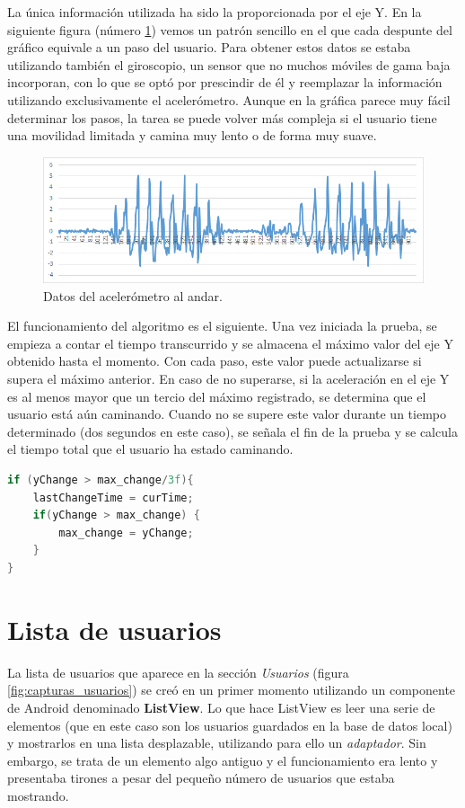 La única información utilizada ha sido la proporcionada por el eje Y. En la siguiente figura (número \ref{fig:acc_8}) vemos un patrón sencillo en el que cada despunte del gráfico equivale a un paso del usuario. Para obtener estos datos se estaba utilizando también el giroscopio, un sensor que no muchos móviles de gama baja incorporan, con lo que se optó por prescindir de él y reemplazar la información utilizando exclusivamente el acelerómetro. Aunque en la gráfica parece muy fácil determinar los pasos, la tarea se puede volver más compleja si el usuario tiene una movilidad limitada y camina muy lento o de forma muy suave.

\begin{figure}[H]
	\centering
	\includegraphics[scale=0.65]{imagenes/grafico_andar.png}
	\caption{Datos del acelerómetro al andar.\label{fig:acc_8}}
\end{figure}

El funcionamiento del algoritmo es el siguiente. Una vez iniciada la prueba, se empieza a contar el tiempo transcurrido y se almacena el máximo valor del eje Y obtenido hasta el momento. Con cada paso, este valor puede actualizarse si supera el máximo anterior. En caso de no superarse, si la aceleración en el eje Y es al menos mayor que un tercio del máximo registrado, se determina que el usuario está aún caminando. Cuando no se supere este valor durante un tiempo determinado (dos segundos en este caso), se señala el fin de la prueba y se calcula el tiempo total que el usuario ha estado caminando.

\begin{lstlisting}[language=Java]
if (yChange > max_change/3f){
    lastChangeTime = curTime;
    if(yChange > max_change) {
        max_change = yChange;
    }
}
\end{lstlisting}

\section{Lista de usuarios}

La lista de usuarios que aparece en la sección \textit{Usuarios} (figura \ref{fig:capturas_usuarios}) se creó en un primer momento utilizando un componente de Android denominado \textbf{ListView}. Lo que hace ListView es leer una serie de elementos (que en este caso son los usuarios guardados en la base de datos local) y mostrarlos en una lista desplazable, utilizando para ello un \textit{adaptador}. Sin embargo, se trata de un elemento algo antiguo y el funcionamiento era lento y presentaba tirones a pesar del pequeño número de usuarios que estaba mostrando. 

